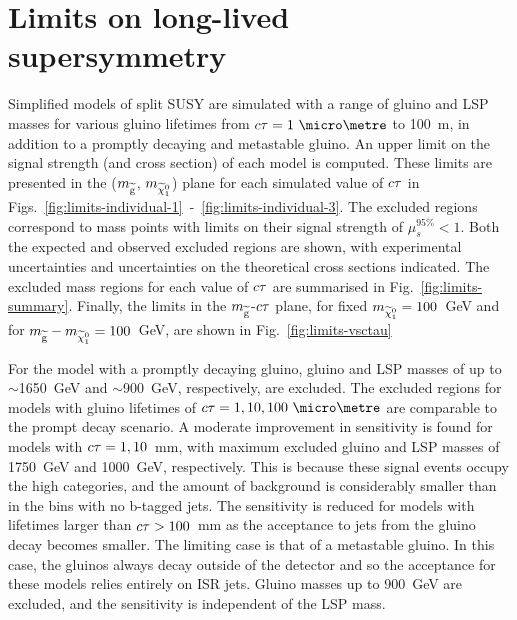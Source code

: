 \section{Limits on long-lived supersymmetry}
\label{sec:results-limits}
Simplified models of split SUSY are simulated with a range of gluino and LSP 
masses for various gluino lifetimes from $\ctau = 1~\micro\metre$ to 100~m, in 
addition to a 
promptly decaying and metastable gluino. An upper limit on the signal strength 
(and cross section) of each model is computed. These limits are presented in 
the ($m_{\mathrm{\widetilde{g}}}$, $m_{\widetilde{\chi}_1^0}$) plane for each simulated value of $c\tau$ in 
Figs.~\ref{fig:limits-individual-1}~-~\ref{fig:limits-individual-3}.
The excluded regions correspond to mass points with limits on their signal 
strength of $\mu_s^{95\%} < 1$. 
Both the expected and observed excluded regions are shown, with experimental 
uncertainties and uncertainties on the theoretical cross sections indicated. 
The excluded mass regions for each value of $c\tau$ are summarised in 
Fig.~\ref{fig:limits-summary}. 
Finally, the limits in the {$m_{\mathrm{\widetilde{g}}}$-$c\tau$} plane, for fixed $m_{\widetilde{\chi}_1^0}=100$~GeV 
and for $m_{\mathrm{\widetilde{g}}} - m_{\widetilde{\chi}_1^0} = 100$~GeV, are shown in Fig.~\ref{fig:limits-vsctau}


For the model with a promptly decaying gluino, gluino and LSP masses of up to 
$\sim$1650~GeV and $\sim$900~GeV, respectively, are excluded. The excluded 
regions for models with gluino lifetimes of $\ctau = 1, 10, 100~\micro\metre$ 
are comparable to the prompt decay scenario. 
A moderate improvement in sensitivity is found for models with $c\tau = 1, 
10$~mm, with maximum excluded gluino and LSP masses of 1750~GeV and 1000~GeV, 
respectively. This is because these signal events occupy the high \nb 
categories, and the amount of background is considerably smaller than in the 
bins with no b-tagged jets. 
The sensitivity is reduced for models with lifetimes larger than $c\tau > 
100$~mm as the acceptance to jets from the gluino decay becomes smaller. The 
limiting case is that of a metastable gluino. In this case, the gluinos always 
decay outside of the detector and so the acceptance for these models relies 
entirely on ISR jets. Gluino masses up to 900~GeV are excluded, and the 
sensitivity is independent of the LSP mass.

